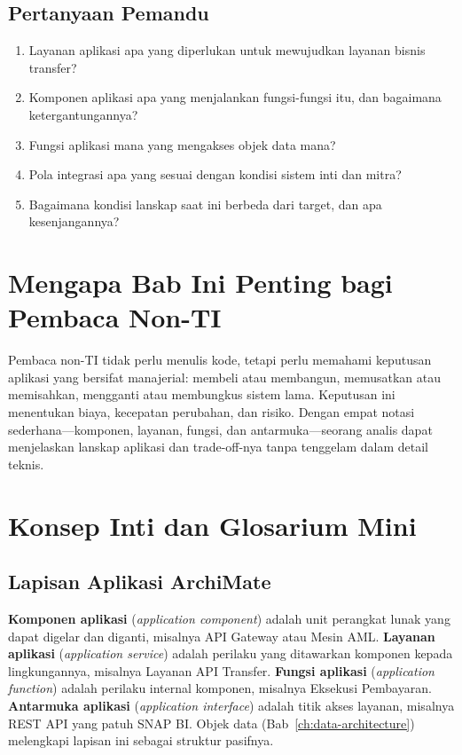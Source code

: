 \subsection*{Pertanyaan Pemandu}
\begin{enumerate}
  \item Layanan aplikasi apa yang diperlukan untuk mewujudkan layanan bisnis
        transfer?
  \item Komponen aplikasi apa yang menjalankan fungsi-fungsi itu, dan bagaimana
        ketergantungannya?
  \item Fungsi aplikasi mana yang mengakses objek data mana?
  \item Pola integrasi apa yang sesuai dengan kondisi sistem inti dan mitra?
  \item Bagaimana kondisi lanskap saat ini berbeda dari target, dan apa
        kesenjangannya?
\end{enumerate}

\section{Mengapa Bab Ini Penting bagi Pembaca Non-TI}

Pembaca non-TI tidak perlu menulis kode, tetapi perlu memahami keputusan
aplikasi yang bersifat manajerial: membeli atau membangun, memusatkan atau
memisahkan, mengganti atau membungkus sistem lama. Keputusan ini menentukan
biaya, kecepatan perubahan, dan risiko. Dengan empat notasi sederhana---komponen,
layanan, fungsi, dan antarmuka---seorang analis dapat menjelaskan lanskap
aplikasi dan trade-off-nya tanpa tenggelam dalam detail teknis.

\section{Konsep Inti dan Glosarium Mini}

\subsection{Lapisan Aplikasi ArchiMate}

\textbf{Komponen aplikasi} (\emph{application component}) adalah unit perangkat
lunak yang dapat digelar dan diganti, misalnya API Gateway atau Mesin AML.
\textbf{Layanan aplikasi} (\emph{application service}) adalah perilaku yang
ditawarkan komponen kepada lingkungannya, misalnya Layanan API Transfer.
\textbf{Fungsi aplikasi} (\emph{application function}) adalah perilaku internal
komponen, misalnya Eksekusi Pembayaran. \textbf{Antarmuka aplikasi}
(\emph{application interface}) adalah titik akses layanan, misalnya REST API yang
patuh SNAP BI. Objek data (Bab~\ref{ch:data-architecture}) melengkapi lapisan ini
sebagai struktur pasifnya.

